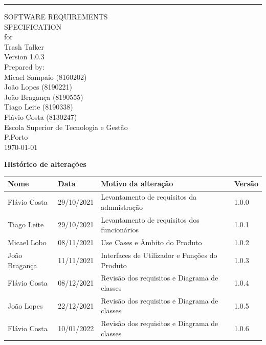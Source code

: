 \documentclass{scrreprt}
\date{}
\def\myversion{1.0.3} %
\begin{document}
	
	\begin{flushright}
		\rule{16cm}{5pt}\vskip1cm
		\begin{bfseries}
			\Huge{SOFTWARE REQUIREMENTS\\ SPECIFICATION}\\
			\vspace{1.cm}
			for\\
			\vspace{1.cm}
			Trash Talker\\
			\vspace{1.cm}
			\LARGE{Version \myversion}\\
			\vspace{1.cm}
			Prepared by:\\ 
			Micael Sampaio (8160202)\\
			João Lopes (8190221)\\
			João Bragança (8190555)\\
			Tiago Leite (8190338)\\
			Flávio Costa (8130247)\\
			\vspace{1.cm}
			Escola Superior de Tecnologia e Gestão \\P.Porto\\
			\vspace{1.cm}
			\today\\
		\end{bfseries}
	\end{flushright}
	
	\tableofcontents
	
	\vspace{4.cm}
	
	\textbf{Histórico de alterações}
	
	
	\begin{tabular}{|p{1.2in}|p{0.7in}|p{2.7in}|p{0.7in}|} \hline 
		\textbf{Nome} & \textbf{Data} & \textbf{Motivo da alteração} & \textbf{Versão} \\ \hline 
		Flávio Costa & 29/10/2021 & Levantamento de requisitos da admnistração & 1.0.0 \\ \hline 
		Tiago Leite & 29/10/2021 & Levantamento de requisitos dos funcionários & 1.0.1 \\ \hline
		Micael Lobo & 08/11/2021 & Use Cases e Âmbito do Produto & 1.0.2 \\ \hline
		João Bragança & 11/11/2021 & Interfaces de Utilizador e Funções do Produto & 1.0.3 \\ \hline 
		Flávio Costa & 08/12/2021 & Revisão dos requisitos e Diagrama de classes & 1.0.4 \\ \hline 
		João Lopes & 22/12/2021 & Revisão dos requisitos e Diagrama de classes & 1.0.5 \\ \hline 	
		Flávio Costa & 10/01/2022 & Revisão dos requisitos e Diagrama de classes & 1.0.6 \\ \hline 
		
	\end{tabular}
	
\end{document}
